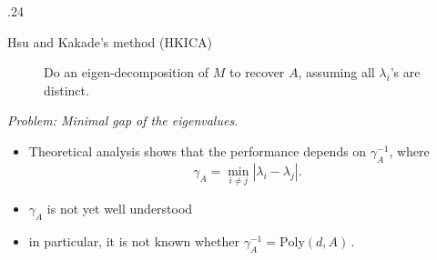 \documentclass[final]{beamer} %
\begin{document}
\begin{frame}[c]
\begin{columns}[t,totalwidth=\textwidth]
\begin{column} {.24\textwidth}
\begin{block}{Hsu and Kakade's method (HKICA)}
\begin{figure}
\begin{algorithmic}[1]
				\STATE Do an eigen-decomposition of $M$ to recover $A$, assuming all $\lambda_i$'s are distinct.
			\end{algorithmic}
			\end{figure}
			\vspace{1cm}
			{\it\large{Problem: Minimal gap of the eigenvalues.}}
			\vspace{1cm}
			\begin{itemize}
				\item Theoretical analysis shows that the performance depends on $\gamma_A^{-1}$,
				where
					\[
					\gamma_A = \min_{i\neq j} \left\vert \lambda_i - \lambda_j\right \vert.
					\]
				\vspace{-1cm}
				\item $\gamma_A$ is not yet well understood
				\item[] in particular, it is not known whether $\gamma_A^{-1} = \mathrm{Poly}(d,A)$\,.
			\end{itemize}
		\end{block}
	\end{column}


\end{columns}
\end{frame}
\end{document}
